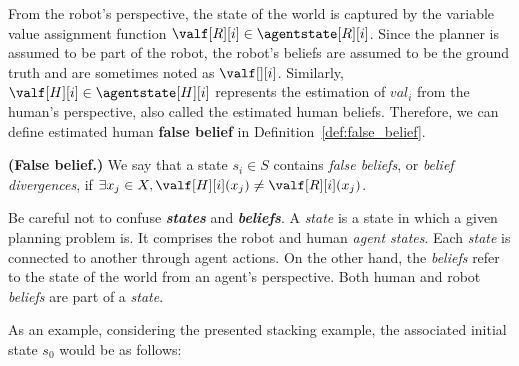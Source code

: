 From the robot's perspective, the state of the world is captured by the variable value assignment function $\valf[R][i] \in \agentstate[R][i]$. Since the planner is assumed to be part of the robot, the robot's beliefs are assumed to be the ground truth and are sometimes noted as $\valf[][i]$. 
Similarly, $\valf[H][i] \in \agentstate[H][i]$ represents the estimation of $val_i$ from the human's perspective, also called the estimated human beliefs. 
Therefore, we can define estimated human \textbf{false belief} in Definition~\ref{def:false_belief}.

\begin{definition}
    \textbf{(False belief.)} We say that a state $s_i \in S$ contains \emph{false beliefs}, or \emph{belief divergences}, if $\exists x_j \in X, \valf[H][i](x_j) \neq \valf[R][i](x_j)$. 
    \label{def:false_belief}
\end{definition}


Be careful not to confuse \textbf{\textit{states}} and \textbf{\textit{beliefs}}. A \textit{state} is a state in which a given planning problem is. It comprises the robot and human \textit{agent states}. Each \textit{state} is connected to another through agent actions. On the other hand, the \textit{beliefs} refer to the state of the world from an agent's perspective. Both human and robot \textit{beliefs} are part of a \textit{state}.



As an example, considering the presented stacking example, the associated initial state $s_0$ would be as follows: 


